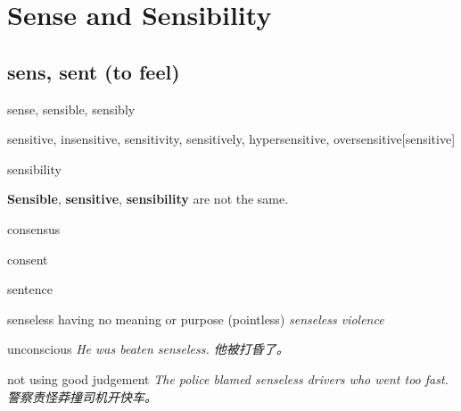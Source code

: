 \chapter{Sense and Sensibility}

\section{sens, sent (to feel)}

\begin{DefWord}{sense, sensible, sensibly}
\end{DefWord}

\begin{DefWord}{sensitive, insensitive, sensitivity, sensitively, hypersensitive, oversensitive}[sensitive]
\end{DefWord}

\begin{DefWord}{sensibility}
\end{DefWord}

\begin{remark}
    \textbf{Sensible}, \textbf{sensitive}, \textbf{sensibility} are not the same.

    
\end{remark}

\begin{DefWord}{consensus}
\end{DefWord}

\begin{DefWord}{consent}
\end{DefWord}

\begin{DefWord}{sentence}
\end{DefWord}

\begin{DefWord}{senseless}
    having no meaning or purpose (pointless)
    \textit{senseless violence}

    unconscious
    \textit{He was beaten senseless. 他被打昏了。}

    not using good judgement
    \textit{The police blamed senseless drivers who went too fast. 警察责怪莽撞司机开快车。}
\end{DefWord}

